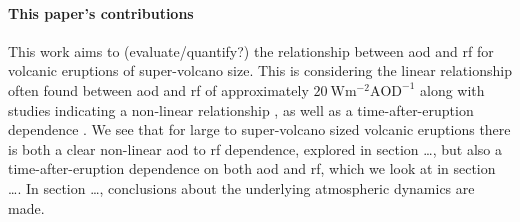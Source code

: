 \documentclass{ametsocV5}
\begin{document}


%
%

\paragraph*{This paper's contributions}

This work aims to (evaluate/quantify?) the relationship between \ac{aod} and \ac{rf} for
volcanic eruptions of super-volcano size. This is considering the linear relationship
often found between \ac{aod} and \ac{rf} of approximately
\(\SI{20}{\watt\metre^{-2}\mathrm{AOD}^{-1}}\) \citep{gregory2016, marshall2020,
  mills2017, myhre2013} along with studies indicating a non-linear relationship
\citep{niemeier2015}, as well as a time-after-eruption dependence \citep{marshall2020}.
We see that for large to super-volcano sized volcanic eruptions there is both a clear
non-linear \ac{aod} to \ac{rf} dependence, explored in section \ldots, but also a
time-after-eruption dependence on both \ac{aod} and \ac{rf}, which we look at in section
\ldots. In section \ldots, conclusions about the underlying atmospheric dynamics are
made.
\end{document}
